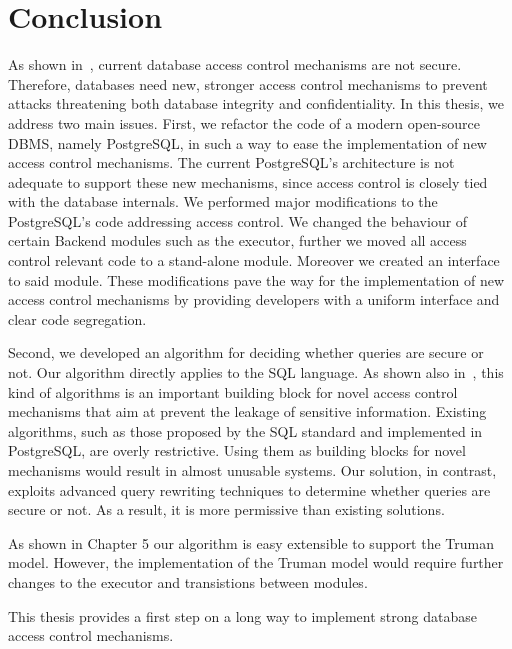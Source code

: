 \section{Conclusion}

As shown in~\cite{guarnieri2016strong}, current database access control mechanisms are not secure.
%
Therefore, databases need new, stronger access control mechanisms to prevent attacks threatening both database integrity and confidentiality.
%
In this thesis, we address two main issues.
%
First, we refactor the code of a modern open-source DBMS, namely PostgreSQL, in such a way to ease the implementation of new access control mechanisms.
%
The current PostgreSQL's architecture is not adequate to support these new mechanisms, since access control is closely tied with the database internals.
%
We performed  major modifications to the PostgreSQL's code addressing access control.
%
We changed the behaviour of certain Backend modules such as the executor, further we moved all access control relevant code to a stand-alone module. 
%
Moreover we created an interface to said module.
%
These modifications pave the way for the implementation of new access control mechanisms by providing developers with a uniform interface and clear code segregation.


Second, we developed an algorithm for deciding whether queries are secure or not.
%
Our algorithm directly applies to the SQL language.
%
As shown also in~\cite{guarnieri2016strong}, this kind of algorithms is an important building block for novel access control mechanisms that aim at prevent the leakage of sensitive information.
%
Existing algorithms, such as those proposed by the SQL standard and implemented in PostgreSQL, are overly restrictive.
%
Using them as building blocks for novel mechanisms would result in almost unusable systems.
%
Our solution, in contrast, exploits advanced query rewriting techniques to determine whether queries are secure or not. 
%
As a result, it is more permissive than existing solutions.

As shown in Chapter 5 our algorithm is easy extensible to support the Truman model.
%
However, the implementation of the Truman model would require further changes to the executor and transistions between modules.
%

This thesis provides a first step on a long way to implement strong database access control mechanisms.
